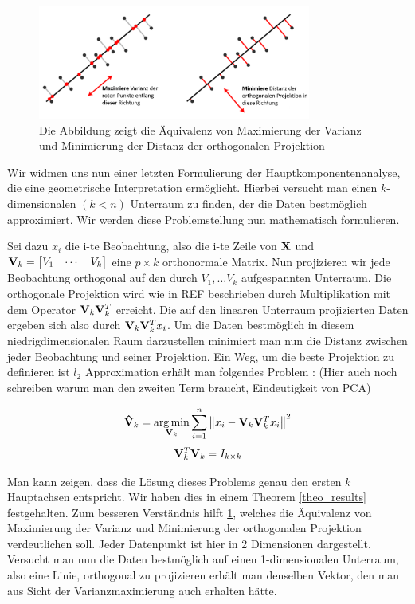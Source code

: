 \begin{figure}
\centering
\includegraphics[width = 0.8\textwidth]{figures/pca_projection_explanation_german.png}
\caption{Die Abbildung zeigt die Äquivalenz von Maximierung der Varianz und Minimierung der Distanz der orthogonalen Projektion}
\label{pca_projection_explanation}
\end{figure}

Wir widmen uns nun einer letzten Formulierung der Hauptkomponentenanalyse, die eine geometrische Interpretation ermöglicht. Hierbei versucht man einen $k$-dimensionalen $(k < n)$ Unterraum zu finden, der die Daten bestmöglich approximiert. Wir werden diese Problemstellung nun mathematisch formulieren.

Sei dazu $x_i$ die i-te Beobachtung, also die i-te Zeile von $\mathbf{X}$ und $\mathbf{V}_k = \begin{bmatrix} V_1 & \cdots & V_k \end{bmatrix}$ eine $p \times k$ orthonormale Matrix. Nun projizieren wir jede Beobachtung orthogonal auf den durch $V_1, \ldots V_k$ aufgespannten Unterraum. Die orthogonale Projektion wird wie in REF beschrieben durch Multiplikation mit dem Operator $\mathbf{V}_k \mathbf{V}_k^T$ erreicht. Die auf den linearen Unterraum projizierten Daten ergeben sich also durch $\mathbf{V}_k \mathbf{V}_k^T x_i$. Um die Daten bestmöglich in diesem niedrigdimensionalen Raum darzustellen minimiert man nun die Distanz zwischen jeder Beobachtung und seiner Projektion. Ein Weg, um die beste Projektion zu definieren ist $l_2$ Approximation erhält man folgendes Problem \cite{zou_sparsepca}: (Hier auch noch schreiben warum man den zweiten Term braucht, Eindeutigkeit von PCA)

\label{pca_regression_formulation}
$$\mathbf{\hat{V}}_k = \operatorname*{arg\,min}_{\mathbf{V}_k} \sum_{i=1}^{n} \left\lVert x_i - \mathbf{V}_k \mathbf{V}_k^Tx_i \right\rVert^2$$
$$\mathbf{V}_k^T\mathbf{V}_k = I_{k \times k}$$

Man kann zeigen, dass die Lösung dieses Problems genau den ersten $k$ Hauptachsen entspricht. Wir haben dies in einem Theorem \ref{theo_results} festgehalten.  \cite{vidal} Zum besseren Verständnis hilft \ref{pca_projection_explanation}, welches die Äquivalenz von Maximierung der Varianz und Minimierung der orthogonalen Projektion verdeutlichen soll. Jeder Datenpunkt ist hier in 2 Dimensionen dargestellt. Versucht man nun die Daten bestmöglich auf einen 1-dimensionalen Unterraum, also eine Linie, orthogonal zu projizieren erhält man denselben Vektor, den man aus Sicht der Varianzmaximierung auch erhalten hätte. 

